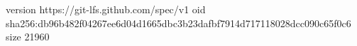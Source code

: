version https://git-lfs.github.com/spec/v1
oid sha256:db96b482f04267ee6d04d1665dbc3b23dafbf7914d717118028dcc090c65f0c6
size 21960
